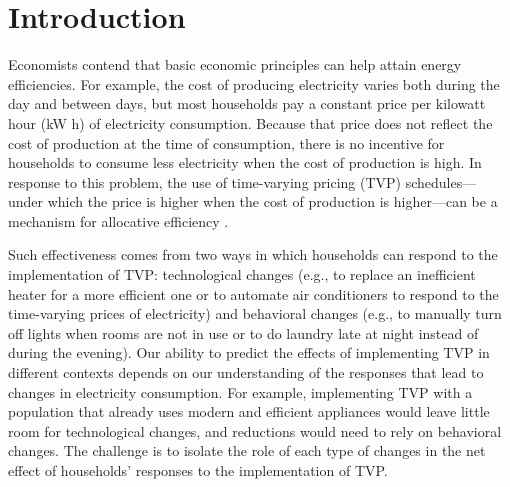 \documentclass[12pt]{article}
\begin{document}



%


\section{Introduction}

Economists contend that basic economic principles can help attain energy efficiencies. For example, the cost of producing electricity varies both during the day and between days, but most households pay a constant price per kilowatt hour (kW h) of electricity consumption. Because that price does not reflect the cost of production at the time of consumption, there is no incentive for households to consume less electricity when the cost of production is high. In response to this problem, the use of time-varying pricing (TVP) schedules--- under which the price is higher when the cost of production is higher---can be a mechanism for allocative efficiency \citep{allcottRethinkingRealtimeElectricity2011,wolakResidentialCustomersRespond2011,jessoeUnderstandingRolePrice2014}.

Such effectiveness comes from two ways in which households can respond to the implementation of TVP: technological changes (e.g., to replace an inefficient heater for a more efficient one or to automate air conditioners to respond to the time-varying prices of electricity) and behavioral changes (e.g., to manually turn off lights when rooms are not in use or to do laundry late at night instead of during the evening). Our ability to predict the effects of implementing TVP in different contexts depends on our understanding of the responses that lead to changes in electricity consumption. For example, implementing TVP with a population that already uses modern and efficient appliances would leave little room for technological changes, and reductions would need to rely on behavioral changes. The challenge is to isolate the role of each type of changes in the net effect of households’ responses to the implementation of TVP.
\end{document}
